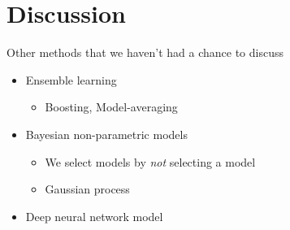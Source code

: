 \documentclass[
  ignorenonframetext,
  aspectratio=169]{beamer}
\providecommand{\tightlist}{%
  \setlength{\itemsep}{0pt}\setlength{\parskip}{0pt}}
\begin{document}
\hypertarget{discussion}{%
\section{Discussion}\label{discussion}}

\begin{frame}{Other methods that we haven't had a chance to discuss}
\protect\hypertarget{other-methods-that-we-havent-had-a-chance-to-discuss}{}
\begin{itemize}
\item
  Ensemble learning

  \begin{itemize}
  \tightlist
  \item
    Boosting, Model-averaging
  \end{itemize}
\item
  Bayesian non-parametric models

  \begin{itemize}
  \item
    We select models by \emph{not} selecting a model
  \item
    Gaussian process
  \end{itemize}
\item
  Deep neural network model
\end{itemize}
\end{frame}
\end{document}
